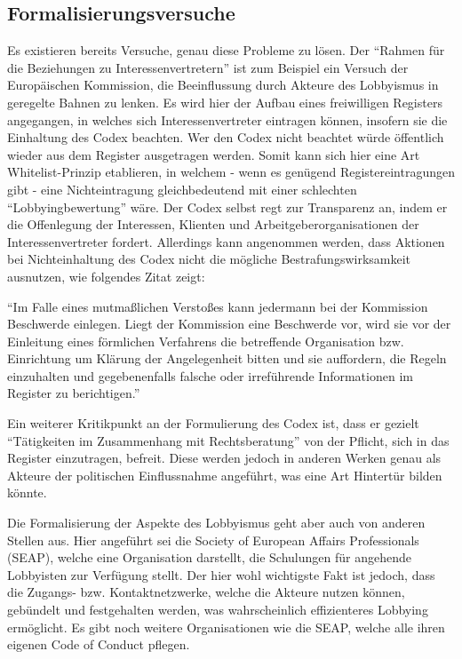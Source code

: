 \subsection{Formalisierungsversuche}
Es existieren bereits Versuche, genau diese Probleme zu lösen. Der ``Rahmen für 
die Beziehungen zu Interessenvertretern''\cite{EuLobbyCodex} ist zum Beispiel 
ein Versuch der 
Europäischen Kommission, die Beeinflussung durch Akteure des Lobbyismus in 
geregelte Bahnen zu lenken. Es wird hier der Aufbau eines freiwilligen 
Registers angegangen, in welches sich Interessenvertreter eintragen können, 
insofern sie die Einhaltung des Codex beachten. Wer den Codex nicht beachtet 
würde öffentlich wieder aus dem Register ausgetragen werden. Somit kann sich 
hier eine Art Whitelist-Prinzip etablieren, in welchem - wenn es genügend 
Registereintragungen gibt - eine Nichteintragung gleichbedeutend mit einer 
schlechten ``Lobbyingbewertung'' wäre. Der Codex selbst regt zur Transparenz 
an, indem er die Offenlegung der Interessen, Klienten und 
Arbeitgeberorganisationen der Interessenvertreter fordert. Allerdings kann 
angenommen werden, dass Aktionen bei Nichteinhaltung des Codex nicht die 
mögliche Bestrafungswirksamkeit ausnutzen, wie folgendes Zitat zeigt:
\begin{displayquote}
``Im Falle eines mutmaßlichen Verstoßes kann jedermann bei der Kommission 
Beschwerde einlegen. Liegt der Kommission eine Beschwerde vor, wird sie vor der 
Einleitung eines förmlichen Verfahrens die betreffende Organisation bzw. 
Einrichtung um Klärung der Angelegenheit bitten und sie auffordern, die Regeln 
einzuhalten und gegebenenfalls falsche oder irreführende Informationen im 
Register zu berichtigen.''\cite{EuLobbyCodex}
\end{displayquote}
Ein weiterer Kritikpunkt an der Formulierung des Codex ist, dass er gezielt 
``Tätigkeiten im Zusammenhang mit Rechtsberatung''\cite{EuLobbyCodex} von der 
Pflicht, sich in das Register einzutragen, befreit. Diese werden jedoch in 
anderen Werken\cite{LeifSpeth200312} genau als Akteure der politischen 
Einflussnahme angeführt, was eine Art Hintertür bilden könnte.

Die Formalisierung der Aspekte des Lobbyismus geht aber auch von anderen 
Stellen aus. Hier angeführt sei die Society of European Affairs Professionals 
(SEAP), welche eine Organisation darstellt, die Schulungen für angehende 
Lobbyisten zur Verfügung stellt. Der hier wohl wichtigste Fakt ist jedoch, dass 
die Zugangs- bzw. Kontaktnetzwerke, welche die Akteure nutzen können, 
gebündelt und festgehalten werden, was wahrscheinlich effizienteres Lobbying 
ermöglicht. Es gibt noch weitere Organisationen wie die SEAP, welche alle ihren 
eigenen Code of Conduct pflegen.\cite{2012lobbyists}

